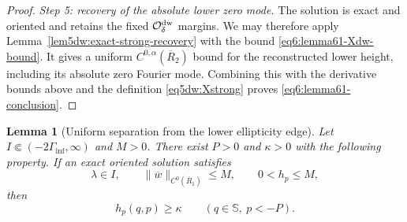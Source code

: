 \documentclass[11pt,reqno]{amsart}
\numberwithin{equation}{section}
\newtheorem{lemma}[theorem]{Lemma}
\theoremstyle{definition}
\theoremstyle{remark}
\begin{document}
\begin{proof}
\smallskip
\noindent\emph{Step 5: recovery of the absolute lower zero mode.}
The solution is exact and oriented and retains the fixed
$\mathcal O_\delta^{\rm dw}$ margins.  We may therefore apply
Lemma~\ref{lem5dw:exact-strong-recovery} with the bound
\eqref{eq6:lemma61-Xdw-bound}.  It gives a uniform
$C^{0,\alpha}(\overline R_2)$ bound for the reconstructed lower
height, including its absolute zero Fourier mode.  Combining this
with the derivative bounds above and the definition
\eqref{eq5dw:Xstrong} proves \eqref{eq6:lemma61-conclusion}.
\end{proof}

\begin{lemma}[Uniform separation from the lower ellipticity edge]
\label{lem6:deep-tail-separation}
Let $I\Subset(-2\Gamma_{\inf},\infty)$ and $M>0$.  There exist
$P>0$ and $\kappa>0$ with the following property.  If an exact
oriented solution satisfies
\[
 \lambda\in I,\qquad
 \|\overline w\|_{C^0(\overline R_1)}\le M,
 \qquad
 0<h_p\le M,
\]
then
\begin{equation}\label{eq:uniform-deep-hp-lower}
 h_p(q,p)\ge\kappa
 \qquad(q\in\mathbb S,\ p<-P).
\end{equation}
\end{lemma}
\end{document}
